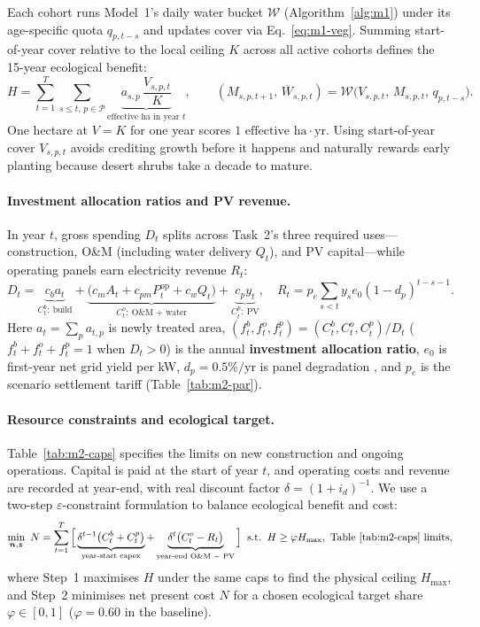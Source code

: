 Each cohort runs Model~1's daily water bucket $\mathcal W$ (Algorithm~\ref{alg:m1}) under its age-specific quota $q_{p,t-s}$ and updates cover via Eq.~\eqref{eq:m1-veg}. Summing start-of-year cover relative to the local ceiling $K$ across all active cohorts defines the 15-year ecological benefit:
\begin{equation}\label{eq:m2-eco}
H=\sum_{t=1}^{T}\sum_{s\le t,\,p\in\mathcal P}\underbrace{a_{s,p}\,\frac{V_{s,p,t}}{K}}_{\text{effective ha in year }t},\qquad
(M_{s,p,t+1},\,\overline W_{s,p,t})=\mathcal W\!\big(V_{s,p,t},\,M_{s,p,t},\,q_{p,t-s}\big).
\end{equation}
One hectare at $V=K$ for one year scores $1\text{ effective ha}\cdot\text{yr}$. Using start-of-year cover $V_{s,p,t}$ avoids crediting growth before it happens and naturally rewards early planting because desert shrubs take a decade to mature.

\paragraph{Investment allocation ratios and PV revenue.} In year $t$, gross spending $D_t$ splits across Task~2's three required uses---construction, O\&M (including water delivery $Q_t$), and PV capital---while operating panels earn electricity revenue $R_t$:
\begin{equation}\label{eq:m2-cash}
D_t=\underbrace{c_b a_t}_{C_t^b:\ \text{build}}+\underbrace{\big(c_m A_t+c_{pm}P_t^{\mathrm{op}}+c_w Q_t\big)}_{C_t^o:\ \text{O\&M + water}}+\underbrace{c_p y_t}_{C_t^p:\ \text{PV}},\quad
R_t=p_e\!\sum_{s<t}y_s e_0(1-d_p)^{t-s-1}.
\end{equation}
Here $a_t=\sum_p a_{t,p}$ is newly treated area, $(f_t^b,f_t^o,f_t^p)=(C_t^b,C_t^o,C_t^p)/D_t$ ($f_t^b+f_t^o+f_t^p=1$ when $D_t>0$) is the annual \textbf{investment allocation ratio}, $e_0$ is first-year net grid yield per kW, $d_p=0.5\%/\text{yr}$ is panel degradation \cite{EN06}, and $p_e$ is the scenario settlement tariff (Table~\ref{tab:m2-par}).

\paragraph{Resource constraints and ecological target.} Table~\ref{tab:m2-caps} specifies the limits on new construction and ongoing operations. Capital is paid at the start of year $t$, and operating costs and revenue are recorded at year-end, with real discount factor $\delta=(1+i_d)^{-1}$. We use a two-step $\varepsilon$-constraint formulation to balance ecological benefit and cost:
\begin{equation}\label{eq:m2-eps}
\min_{\bm n,\bm z}\ N=\sum_{t=1}^{T}\Big[\underbrace{\delta^{t-1}\big(C_t^b+C_t^p\big)}_{\text{year-start capex}}+\underbrace{\delta^{t}\big(C_t^o-R_t\big)}_{\text{year-end O\&M $-$ PV}}\Big]
\;\;\text{s.t.}\;\; H\ge\varphi H_{\max},\ \text{Table~\ref{tab:m2-caps} limits},
\end{equation}
where Step~1 maximises $H$ under the same caps to find the physical ceiling $H_{\max}$, and Step~2 minimises net present cost $N$ for a chosen ecological target share $\varphi\in[0,1]$ ($\varphi=0.60$ in the baseline).

